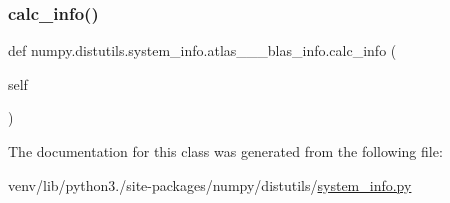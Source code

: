 \subsubsection{\texorpdfstring{calc\+\_\+info()}{calc\_info()}}
{\footnotesize\ttfamily def numpy.\+distutils.\+system\+\_\+info.\+atlas\+\_\+\_\+\_\+blas\+\_\+info.\+calc\+\_\+info (\begin{DoxyParamCaption}\item[{}]{self }\end{DoxyParamCaption})}



The documentation for this class was generated from the following file\+:\begin{DoxyCompactItemize}
\item 
venv/lib/python3./site-\/packages/numpy/distutils/\hyperlink{system__info_8py}{system\+\_\+info.\+py}\end{DoxyCompactItemize}
